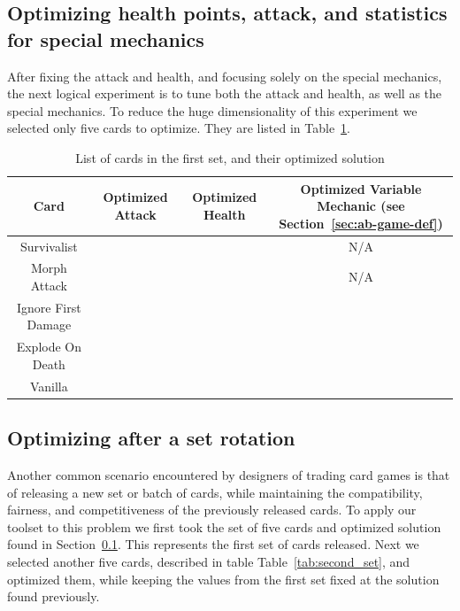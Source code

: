 \subsection{Optimizing health points, attack, and statistics for special mechanics} \label{sec:first_set}

After fixing the attack and health, and focusing solely on the special mechanics, the next logical experiment is to tune both the attack and health, as well as the special mechanics. To reduce the huge dimensionality of this experiment we selected only five cards to optimize. They are listed in Table~\ref{tab:first_set}.

\begin{table}[t]
\centering
\begin{tabular}{||c c c c||} 
 \hline
 Card & Optimized Attack & Optimized Health & Optimized Variable Mechanic (see Section~\ref{sec:ab-game-def})\\ [0.5ex]
 \hline
 Survivalist &  &  & N/A \\
 \hline
 Morph Attack &  &  & N/A \\
 \hline
 Ignore First Damage &  &  & \\
 \hline
 Explode On Death &  &  &  \\ 
 \hline
 Vanilla &  &  &  \\
 \hline
\end{tabular}
\caption{List of cards in the first set, and their optimized solution}
\label{tab:first_set}
\end{table}



\subsection{Optimizing after a set rotation}

Another common scenario encountered by designers of trading card games is that of releasing a new set or batch of cards, while maintaining the compatibility, fairness, and competitiveness of the previously released cards. To apply our toolset to this problem we first took the set of five cards and optimized solution found in Section~\ref{sec:first_set}. This represents the first set of cards released. Next we selected another five cards, described in table Table~\ref{tab:second_set}, and optimized them, while keeping the values from the first set fixed at the solution found previously. 


